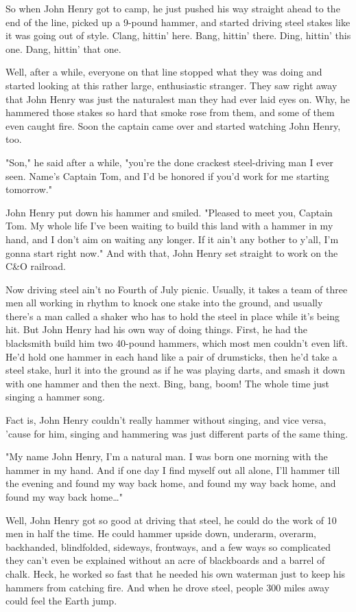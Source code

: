 So when John Henry got to camp, he just pushed his way straight ahead to the end of the line, picked up a 9-pound hammer, and started driving steel stakes like it was going out of style. Clang, hittin' here. Bang, hittin' there. Ding, hittin' this one. Dang, hittin' that one.

Well, after a while, everyone on that line stopped what they was doing and started looking at this rather large, enthusiastic stranger. They saw right away that John Henry was just the naturalest man they had ever laid eyes on. Why, he hammered those stakes so hard that smoke rose from them, and some of them even caught fire. Soon the captain came over and started watching John Henry, too.

"Son," he said after a while, "you're the done crackest steel-driving man I ever seen. Name's Captain Tom, and I'd be honored if you'd work for me starting tomorrow."

John Henry put down his hammer and smiled. "Pleased to meet you, Captain Tom. My whole life I've been waiting to build this land with a hammer in my hand, and I don't aim on waiting any longer. If it ain't any bother to y'all, I'm gonna start right now." And with that, John Henry set straight to work on the C\&O railroad.

Now driving steel ain't no Fourth of July picnic. Usually, it takes a team of three men all working in rhythm to knock one stake into the ground, and usually there's a man called a shaker who has to hold the steel in place while it's being hit. But John Henry had his own way of doing things. First, he had the blacksmith build him two 40-pound hammers, which most men couldn't even lift. He'd hold one hammer in each hand like a pair of drumsticks, then he'd take a steel stake, hurl it into the ground as if he was playing darts, and smash it down with one hammer and then the next. Bing, bang, boom! The whole time just singing a hammer song.

Fact is, John Henry couldn't really hammer without singing, and vice versa, 'cause for him, singing and hammering was just different parts of the same thing.

"My name John Henry, I'm a natural man. I was born one morning with the hammer in my hand. And if one day I find myself out all alone, I'll hammer till the evening and found my way back home, and found my way back home, and found my way back home\dots"

Well, John Henry got so good at driving that steel, he could do the work of 10 men in half the time. He could hammer upside down, underarm, overarm, backhanded, blindfolded, sideways, frontways, and a few ways so complicated they can't even be explained without an acre of blackboards and a barrel of chalk. Heck, he worked so fast that he needed his own waterman just to keep his hammers from catching fire. And when he drove steel, people 300 miles away could feel the Earth jump.

